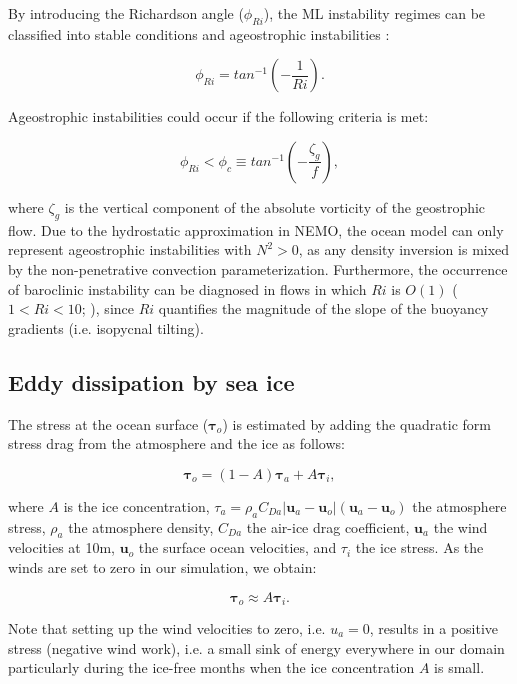 \documentclass[draft]{agujournal2019}
\begin{document}
By introducing the Richardson angle ($\phi_{Ri}$), the ML instability regimes can be classified into stable conditions and ageostrophic instabilities \citep{Thomas_symmetric_2013}:
\begin{linenomath*}
\begin{equation}
  \phi_{Ri} = tan^{-1}\left( -\frac{1}{Ri}\right).
  \label{eq:eq11}
\end{equation}
\end{linenomath*}
Ageostrophic instabilities could occur if the following criteria is met:
\begin{linenomath*}
\begin{equation}
  \phi_{Ri} < \phi_c  \equiv tan^{-1} \left(-\frac{\zeta_g}{f}\right),
  \label{eq:eq12}
\end{equation}
\end{linenomath*}
where $\zeta_g$ is the vertical component of the absolute vorticity of the geostrophic flow. Due to the hydrostatic approximation in NEMO, the ocean model can only represent ageostrophic instabilities with $N^2>0$, as any density inversion is mixed by the non-penetrative convection parameterization. Furthermore, the occurrence of baroclinic instability can be diagnosed in flows in which $Ri$ is $O(1)$ ($1 < Ri < 10$; \citealt{Haine_instability_1998}), since $Ri$ quantifies the magnitude of the slope of the buoyancy gradients (i.e. isopycnal tilting). 

\subsection{Eddy dissipation by sea ice}
\label{ice_stress}

The stress at the ocean surface ($\boldsymbol{\tau}_o $) is estimated by adding the quadratic form stress drag from the atmosphere and the ice as follows:
\begin{linenomath*}
\begin{equation}
  \boldsymbol{\tau}_o = (1 - A) \boldsymbol{\tau}_a +  A \boldsymbol{\tau}_i,
  \label{eq:eq15}
\end{equation}
\end{linenomath*}
where $A$ is the ice concentration, $\tau_a = \rho_a C_{Da} | \mathbf{u}_a - \mathbf{u}_o | \left(\mathbf{u}_a - \mathbf{u}_o\right)$ the atmosphere stress, $\rho_a$ the atmosphere density, $C_{Da}$ the air-ice drag coefficient, $\mathbf{u}_a$ the wind velocities at 10m, $\mathbf{u}_o$ the surface ocean velocities, and $\tau_i$ the ice stress. As the winds are set to zero in our simulation, we obtain:
\begin{linenomath*}
  \begin{equation}
    \boldsymbol{\tau}_o \approx A \boldsymbol{\tau}_i.
    \label{eq:eq16}
  \end{equation}
\end{linenomath*}
Note that setting up the wind velocities to zero, i.e. $u_a=0$, results in a positive stress (negative wind work), i.e. a small sink of energy everywhere in our domain particularly during the ice-free months when the ice concentration $A$ is small. 
\end{document}
